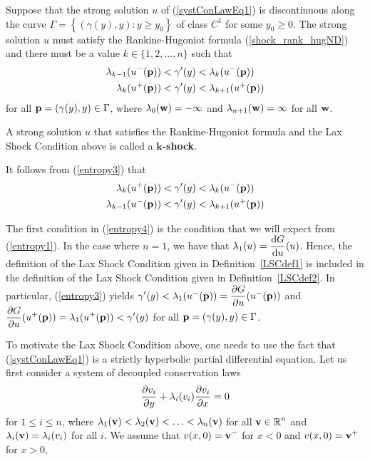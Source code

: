 \begin{defn}  \label{LSCdef2}
Suppose that the strong solution $u$ of (\ref{systConLawEq1}) is discontinuous
along the curve
$\displaystyle \Gamma = \left\{ (\gamma(y),y) : y \geq y_0 \right\}$
of class $\displaystyle C^1$ for some $y_0 \geq 0$.  The strong solution $u$
must satisfy the Rankine-Hugoniot formula (\ref{shock_rank_hugND}) and
there must be a value $k \in \{1,2,\ldots,n\}$ such that
\begin{equation} \label{entropy3}
\begin{split}
\lambda_{k-1}(u^-(\mathbf{p})) &< \gamma'(y) < \lambda_k(u^-(\mathbf{p})) \\
\lambda_{k}(u^+(\mathbf{p})) &< \gamma'(y) < \lambda_{k+1}(u^+(\mathbf{p}))
\end{split}
\end{equation}
for all $\mathbf{p}=(\gamma(y),y) \in \Gamma$, where
$\lambda_0(\mathbf{w}) = -\infty$ and $\lambda_{n+1}(\mathbf{w}) = \infty$
for all $\mathbf{w}$.  

A strong solution $u$ that satisfies the Rankine-Hugoniot formula and
the Lax Shock Condition above is called a
{\bfseries $\mathbf{k}$-shock}.
\end{defn}

It follows from (\ref{entropy3}) that
\begin{equation} \label{entropy4}
\begin{split}
\lambda_k(u^+(\mathbf{p})) &< \gamma'(y) < \lambda_k(u^-(\mathbf{p})) \\
\lambda_{k-1}(u^-(\mathbf{p})) &< \gamma'(y) < \lambda_{k+1}(u^+(\mathbf{p}))
\end{split}
\end{equation}

The first condition in (\ref{entropy4}) is the
condition that we will expect from (\ref{entropy1}).
In the case where $n=1$, we have that
$\displaystyle \lambda_1(u) = \frac{\mathrm{d}G}{\mathrm{d}{u}}(u)$.  Hence,
the definition of the Lax Shock Condition given in Definition~\ref{LSCdef1}
is included in the definition of the Lax Shock Condition given in
Definition~\ref{LSCdef2}.  In particular, (\ref{entropy3}) yields
$\displaystyle \gamma'(y) < \lambda_1(u^-(\mathbf{p}))
= \frac{\partial{G}}{\partial u}(u^-(\mathbf{p}))$ and
$\displaystyle \frac{\partial{G}}{\partial u}(u^+(\mathbf{p})) = \lambda_1(u^+(\mathbf{p}))
< \gamma'(y)$ for all $\mathbf{p}=(\gamma(y),y) \in \Gamma$.

To motivate the Lax Shock Condition above, one needs to use the fact that
(\ref{systConLawEq1}) is a strictly hyperbolic partial differential equation.
Let us first consider a system of decoupled conservation laws
\begin{equation} \label{systConLawEq3}
\frac{\partial{v_i}}{\partial y} + \lambda_i(v_i) \frac{\partial{v_i}}{\partial x} = 0
\end{equation}
for $1 \leq i \leq n$, where
$\lambda_1(\mathbf{v}) < \lambda_2(\mathbf{v}) < \ldots < \lambda_n(\mathbf{v})$
for all $\displaystyle \mathbf{v} \in \mathbb{R}^n$
and $\lambda_i(\mathbf{v}) = \lambda_i(v_i)$ for all $i$.
We assume that $\displaystyle v(x,0) = \mathbf{v}^-$ for $x<0$ and
$\displaystyle v(x,0) = \mathbf{v}^+$ for $x>0$, 

